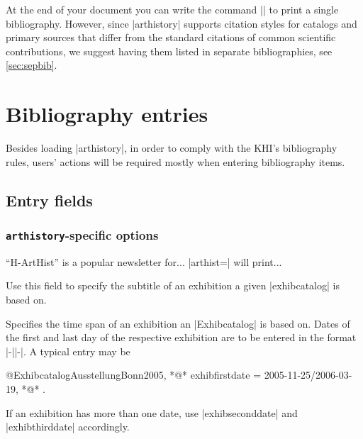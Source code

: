 \documentclass[a4paper,
10pt,
ngerman,
english
]{ltxdoc}
\begin{document}
At the end of your document you can write the command |\printbibliography| to print 
a single bibliography.
However, since |arthistory| supports citation styles for catalogs and primary sources that differ from the standard citations of common scientific contributions, we suggest having them listed in separate bibliographies, see \cref{sec:sepbib}.



\section{Bibliography entries}
Besides loading |arthistory|, in order to comply with the KHI's bibliography rules, users' actions will be required mostly when entering bibliography items.

\subsection{Entry fields}

\subsubsection{\texttt{arthistory}-specific options}

\enquote{H-ArtHist} is a popular newsletter for... %
|arthist=| will print...

Use this field to specify the subtitle of an exhibition a given |exhibcatalog| is based on.

Specifies the time span of an exhibition an |Exhibcatalog| is based on. Dates of the first and last day of the respective exhibition are to be entered in the format |-||-|. A typical entry may be
\begin{code}
@Exhibcatalog{AusstellungBonn2005,
  *@\ldots@*
  exhibfirstdate = {2005-11-25/2006-03-19},
  *@\ldots@*
}.
\end{code}
If an exhibition has more than one date, use |exhibseconddate| and |exhibthirddate| accordingly.
\end{document}
